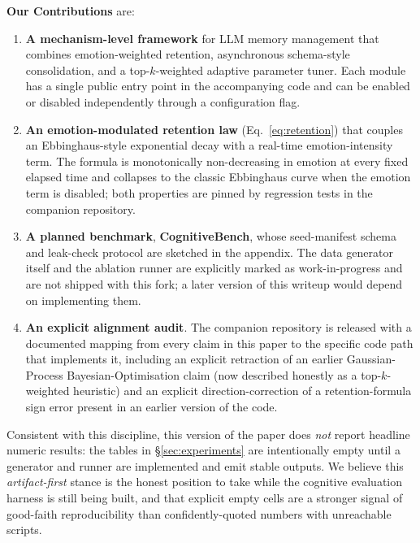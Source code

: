\textbf{Our Contributions} are:
\begin{enumerate}
    \item \textbf{A mechanism-level framework} for LLM memory management that combines emotion-weighted retention, asynchronous schema-style consolidation, and a top-$k$-weighted adaptive parameter tuner. Each module has a single public entry point in the accompanying code and can be enabled or disabled independently through a configuration flag.
    \item \textbf{An emotion-modulated retention law} (Eq.~\ref{eq:retention}) that couples an Ebbinghaus-style exponential decay with a real-time emotion-intensity term. The formula is monotonically non-decreasing in emotion at every fixed elapsed time and collapses to the classic Ebbinghaus curve when the emotion term is disabled; both properties are pinned by regression tests in the companion repository.
    \item \textbf{A planned benchmark}, \textbf{CognitiveBench}, whose seed-manifest schema and leak-check protocol are sketched in the appendix. The data generator itself and the ablation runner are explicitly marked as work-in-progress and are not shipped with this fork; a later version of this writeup would depend on implementing them.
    \item \textbf{An explicit alignment audit}. The companion repository is released with a documented mapping from every claim in this paper to the specific code path that implements it, including an explicit retraction of an earlier Gaussian-Process Bayesian-Optimisation claim (now described honestly as a top-$k$-weighted heuristic) and an explicit direction-correction of a retention-formula sign error present in an earlier version of the code.
\end{enumerate}

Consistent with this discipline, this version of the paper does \emph{not} report headline numeric results: the tables in \S\ref{sec:experiments} are intentionally empty until a generator and runner are implemented and emit stable outputs. We believe this \emph{artifact-first} stance is the honest position to take while the cognitive evaluation harness is still being built, and that explicit empty cells are a stronger signal of good-faith reproducibility than confidently-quoted numbers with unreachable scripts.
